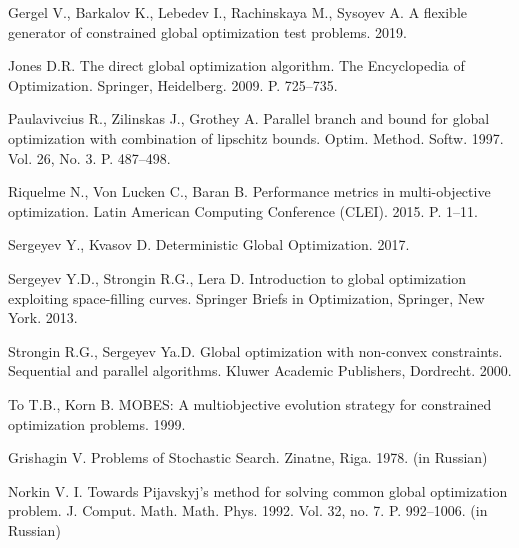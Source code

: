 \documentclass{cmi}
\begin{document}
\begin{biblio_lat}
Gergel V., Barkalov K., Lebedev I., Rachinskaya M., Sysoyev A.
\newblock A flexible generator of constrained global optimization test
  problems. 2019.
\newblock {}

{Jones D.R.}
\newblock The direct global optimization algorithm.
\newblock The Encyclopedia of Optimization. Springer, Heidelberg. 2009. P.
  725--735.
\newblock {}

{Paulavivcius R., Zilinskas J., Grothey A.}
\newblock Parallel branch and bound for global optimization with combination of
  lipschitz bounds.
\newblock Optim. Method. Softw. 1997. Vol. 26, No. 3. P. 487--498.
\newblock {}

{Riquelme} N., {Von Lucken} C., {Baran} B.
\newblock Performance metrics in multi-objective optimization.
 Latin American Computing Conference (CLEI). 2015. P. 1--11.
\newblock {}

Sergeyev Y., Kvasov D. Deterministic Global Optimization. 2017.
\newblock {}

{Sergeyev Y.D., Strongin R.G., Lera D.} Introduction to global optimization
  exploiting space-filling curves.
\newblock Springer Briefs in Optimization, Springer, New York. 2013.
\newblock {}

{Strongin R.G., Sergeyev Ya.D.} Global optimization with non-convex
  constraints. Sequential and parallel algorithms.
\newblock Kluwer Academic Publishers, Dordrecht. 2000.
\newblock {}

To T.B., Korn B.
\newblock MOBES: A multiobjective evolution strategy for constrained
  optimization problems. 1999.

{Grishagin V.}
\newblock Problems of Stochastic Search. Zinatne, Riga. 1978. (in Russian)

{Norkin V. I.}
\newblock Towards Pijavskyj's method for solving common global optimization problem.
\newblock J. Comput. Math. Math. Phys. 1992. Vol. 32, no. 7. P. 992--1006. (in Russian)

\end{biblio_lat}
\end{document}
